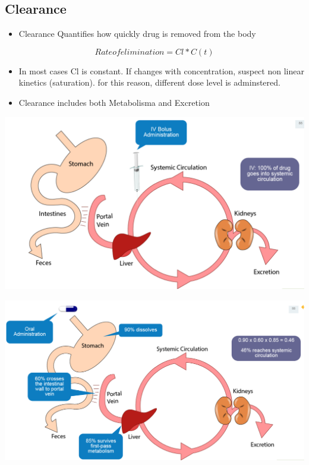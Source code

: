 \documentclass[
  letterpaper,
  DIV=11,
  numbers=noendperiod]{scrreprt}
\providecommand{\tightlist}{%
  \setlength{\itemsep}{0pt}\setlength{\parskip}{0pt}}\usepackage{longtable,booktabs,array}
\begin{document}
\hypertarget{clearance}{%
\subsection{Clearance}\label{clearance}}

\begin{itemize}
\tightlist
\item
  Clearance Quantifies how quickly drug is removed from the body
\end{itemize}

\[
Rate of elimination = Cl * C(t)
\]

\begin{itemize}
\item
  In most cases Cl is constant. If changes with concentration, suspect
  non linear kinetics (saturation). for this reason, different dose
  level is adminstered.
\item
  Clearance includes both Metabolisma and Excretion
\end{itemize}

\includegraphics{./images/image-284829586.png}

\includegraphics{./images/image-510239295.png}
\end{document}
